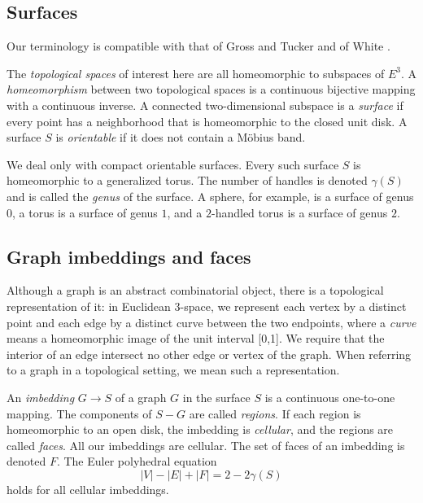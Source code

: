 \documentclass [11pt] {report}
\begin{document}
\subsection{Surfaces}  Our terminology is compatible with that of Gross and
Tucker \cite{gt} and of White \cite{white}.

The {\it topological spaces} of interest here are all homeomorphic to
subspaces of $E^3$.  A {\it homeomorphism} between two topological spaces is
a continuous bijective mapping with a continuous inverse.  A connected
two-dimensional subspace is a {\it surface} if every point has a neighborhood that
is homeomorphic to the closed unit disk.  A surface $S$ is {\it orientable}
if it does not contain a M\"obius band.

We deal only with compact orientable surfaces.  Every such surface $S$ is
homeomorphic to a generalized torus.  The number of handles is denoted
$\gamma(S)$ and is called the {\it genus} of the surface.  A sphere, for
example, is a surface of genus $0$, a torus is a surface of genus $1$, and a
$2$-handled torus is a surface of genus $2$.

\subsection {Graph imbeddings and faces} 
Although a graph is an abstract
combinatorial object, there is a topological representation of it:  in
Euclidean 3-space, we represent each vertex by a distinct point and each
edge by a distinct curve between the two endpoints, where a {\it curve}
means a homeomorphic image of the unit interval [0,1].  We require that the
interior of an edge intersect no other edge or vertex of the graph.  When
referring to a graph in a topological setting, we mean such a
representation.

An {\it imbedding} $G \rightarrow S$ of a graph $G$ in the surface $S$ is a
continuous one-to-one mapping.  The components of $S-G$ are
called {\it regions}.  If each region is homeomorphic to an open disk, the
imbedding is {\it cellular}, and the regions are called {\it faces}.  All our
imbeddings are cellular.  The set of faces of an imbedding is denoted $F$.
The Euler polyhedral equation 
\begin{equation}
|V| - |E| + |F| = 2 - 2\gamma(S)
\label{eulereqn}
\end{equation} holds for all cellular imbeddings.  



\end{document}
